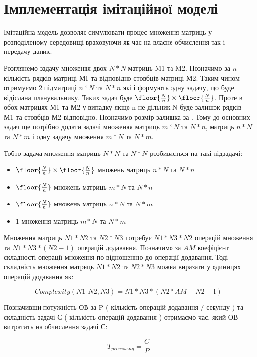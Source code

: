 \section{Імплементація імітаційної моделі}

Імітаційна модель дозволяє симулювати процес множення матриць у розподіленому середовищі враховуючи як час на власне обчислення так і передачу даних.

Розглянемо задачу множення двох $N*N$ матриць M1 та M2. Позначимо за $n$ кількість рядків матриці М1 та відповідно стовбців матриці М2. Таким чином отримуємо 2 підматриці $n*N$ та $N*n$ які і формують одну задачу, що буде відіслана планувальнику. Таких задач буде $ \floor{ \frac{N}{n} } \times \floor{ \frac{N}{n} } $. Проте в обох матрицях М1 та М2 у випадку якщо n не дільник N буде залишок рядків М1 та стовбців М2 відповідно. Позначимо розмір залишка за  . Тому до основних задач ще потрібно додати задачі множення матриць $m*N$ та $N*n$, матриць $n*N$ та $N*m$ і одну задачу множення  $m*N$ та $N*m$.

Тобто задача множення матриць $N*N$ та $N*N$ розбивається на такі підзадачі:
\begin{itemize}
	\item $ \floor{ \frac{N}{n} } \times \floor{ \frac{N}{n} } $ множень матриць $n*N$ та $N*n$ 
	\item $ \floor{ \frac{N}{n} } $ множень матриць $m*N$ та $N*n$ 
	\item $ \floor{ \frac{N}{n} } $ множень матриць $n*N$ та $N*m$ 
	\item 1 множення матриць $m*N$ та $N*m$ 
\end{itemize}

Множення матриць $N1*N2$ та $N2*N3$ потребує $N1*N3*N2$ операцій множення та $N1*N3*(N2-1)$ операцій додавання. Позначимо за $AM$ коефіцієнт складності операції множення по відношенню до операції додавання. Тоді складність множення матриць $N1*N2$ та $N2*N3$ можна виразати у одиницях операцій додавання як:

\begin{equation}
\label{eq:complexity_fmla}
Complexity(N1,N2,N3) = N1*N3*( N2 *AM + N2 - 1)
\end{equation}

Позначивши потужність ОВ за P ( кількість операцій додавання / секунду ) та складність задачі С ( кількість операцій додавання ) отримаємо час, який ОВ витратить на обчислення задачі С:

\begin{equation}
\label{eq:processing_time_simple}
T_{processing} = \frac{C}{P}
\end{equation}

